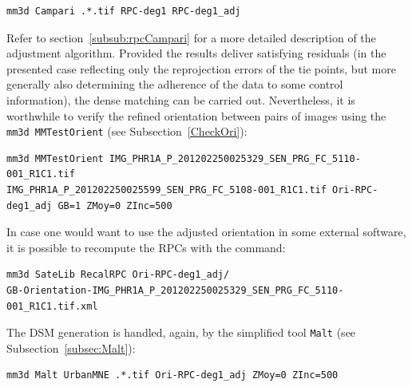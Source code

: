 \begin{verbatim}
mm3d Campari .*.tif RPC-deg1 RPC-deg1_adj
\end{verbatim}
%   
Refer to section~\ref{subsub:rpcCampari} for a more detailed description of the adjustment algorithm. Provided the results deliver satisfying residuals (in the presented case reflecting only the reprojection errors of the tie points, but more generally also determining the adherence of the data to some control information), the dense matching can be carried out. Nevertheless, it is worthwhile to verify the refined orientation between pairs of images using the {\tt mm3d MMTestOrient} (see Subsection~\ref{CheckOri}):
\begin{verbatim}
mm3d MMTestOrient IMG_PHR1A_P_201202250025329_SEN_PRG_FC_5110-001_R1C1.tif 
IMG_PHR1A_P_201202250025599_SEN_PRG_FC_5108-001_R1C1.tif Ori-RPC-deg1_adj GB=1 ZMoy=0 ZInc=500
\end{verbatim}
%
In case one would want to use the adjusted orientation in some external software, it is possible to recompute the RPCs with the command:
\begin{verbatim}
mm3d SateLib RecalRPC Ori-RPC-deg1_adj/
GB-Orientation-IMG_PHR1A_P_201202250025329_SEN_PRG_FC_5110-001_R1C1.tif.xml
\end{verbatim}
The DSM generation is handled, again, by the simplified tool {\tt Malt} (see Subsection~\ref{subsec:Malt}): 
\begin{verbatim}
mm3d Malt UrbanMNE .*.tif Ori-RPC-deg1_adj ZMoy=0 ZInc=500
\end{verbatim}
%


